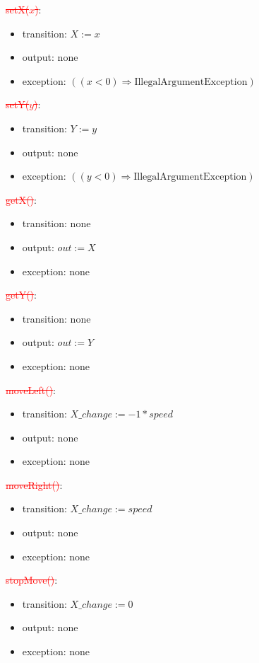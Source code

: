 \documentclass[12pt]{article}
\begin{document}
\noindent \textcolor{red}{\st{setX($\mathit{x}$)}}:
\begin{itemize}
\item transition: $X := x$ 
\item output: none
\item exception: $((\mathit{x} < 0) \Rightarrow \text{IllegalArgumentException})$
\end{itemize}

\noindent \textcolor{red}{\st{setY($\mathit{y}$)}}:
\begin{itemize}
\item transition: $Y := y$ 
\item output: none
\item exception: $((\mathit{y} < 0) \Rightarrow \text{IllegalArgumentException})$
\end{itemize}

\noindent \textcolor{red}{\st{getX()}}:
\begin{itemize}
\item transition: none
\item output: $out := X$
\item exception: none
\end{itemize}

\noindent \textcolor{red}{\st{getY()}}:
\begin{itemize}
\item transition: none
\item output: $out := Y$
\item exception: none
\end{itemize}

\noindent \textcolor{red}{\st{moveLeft()}}:
\begin{itemize}
\item transition: $X\_change := -1 * speed$
\item output: none
\item exception: none
\end{itemize}

\noindent \textcolor{red}{\st{moveRight()}}:
\begin{itemize}
\item transition: $X\_change := speed$
\item output: none
\item exception: none
\end{itemize}

\noindent \textcolor{red}{\st{stopMove()}}:
\begin{itemize}
\item transition: $X\_change := 0$
\item output: none
\item exception: none
\end{itemize}
\end{document}
